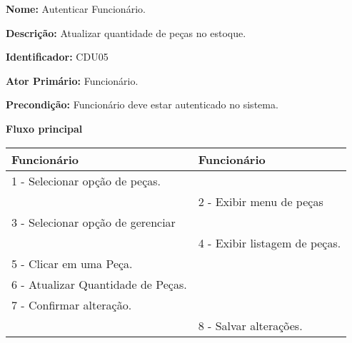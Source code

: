 \par
\textbf{Nome:} Autenticar Funcionário.
\par
\textbf{Descrição:}  Atualizar quantidade de peças no estoque.	
\par 
\textbf{Identificador:} CDU05
\par
\textbf{Ator Primário:} Funcionário.	
\par
\textbf{Precondição:} Funcionário deve estar autenticado no sistema.
\par
\par
\textbf{Fluxo principal}\par
\begin{tabular}{|p{7cm}|p{7cm}|}
	\hline 
	
	
	Funcionário
	& 
	
	Funcionário
	\\ 
	\hline 
	
	
	1 - Selecionar opção de peças.
	&  \\ 
	\hline 
	& 
	
	2 - Exibir menu de peças
	\\ 
	\hline 
	
	
	3 - Selecionar opção de gerenciar
	&  \\ 
	\hline 
	& 
	
	4 - Exibir listagem de peças.
	\\ 
	\hline 
	
	
	5 - Clicar em uma Peça.
	&  \\ 
	\hline 
	
	
	6 - Atualizar Quantidade de Peças.
	&  \\ 
	\hline 
	
	
	7 - Confirmar alteração.
	&  \\ 
	\hline 
	& 
	
	8 - Salvar alterações.
	\\ 
	\hline 
\end{tabular} 
